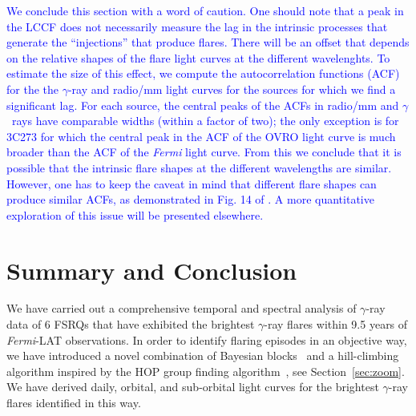 \documentclass[twocolumn,linenumbers]{aastex62}
\newcommand{\Grays}{$\gamma$~rays\xspace}
\newcommand{\gray}{$\gamma$-ray\xspace}
\newcommand{\fermiLAT}{\emph{Fermi}-LAT\xspace}
\newcommand{\response}[1]{\textcolor{blue}{#1}}
\begin{document}
\response{
We conclude this section with a word of caution. 
One should note that a peak in the LCCF does not necessarily measure the lag in the intrinsic processes that generate the ``injections'' that produce flares.
There will be an offset that depends on the relative shapes of the flare light curves at the different wavelenghts. 
To estimate the size of this effect, we compute the autocorrelation functions (ACF) for the the \gray and  radio/mm light curves for the sources for which we find a significant lag. 
For each source, the central peaks of the ACFs in radio/mm and \Grays have comparable widths (within a factor of two); the only exception is for 3C273 for which the central peak in the ACF of the OVRO light curve is much broader than the ACF of the \emph{Fermi} light curve. 
From this we conclude that it is possible that the intrinsic flare shapes at the different wavelengths are similar. 
However, one has to keep the caveat in mind that different flare shapes can produce similar ACFs, as demonstrated in Fig. 14 of \citet{1981ApJS...45....1S}.
A more quantitative exploration of this issue will be presented elsewhere. 
}

\section{Summary and Conclusion}
\label{sec:conclusion}

We have carried out a comprehensive temporal and spectral analysis of  \gray data of 6 FSRQs that have exhibited the brightest \gray flares within 9.5 years of \fermiLAT observations.
In order to identify flaring episodes in an objective way, we have introduced a novel combination of Bayesian blocks~\citep[BBs,][]{2013ApJ...764..167S} and a hill-climbing algorithm inspired by the HOP group finding algorithm~\citep{1998ApJ...498..137E}, see Section~\ref{sec:zoom}.
We have derived daily, orbital, and sub-orbital light curves for the brightest \gray flares identified in this way.
\end{document}
